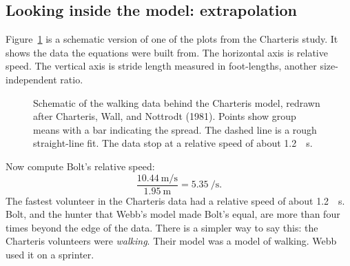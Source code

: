\documentclass[11pt,twoside,openany]{book}
\begin{document}
\subsection{Looking inside the model: extrapolation}

Figure~\ref{fig:charteris} is a schematic version of one of the plots from the Charteris study. It shows the data the equations were built from. The horizontal axis is relative speed. The vertical axis is stride length measured in foot-lengths, another size-independent ratio.

\begin{figure}[htb]
\centering
{}
\caption{Schematic of the walking data behind the Charteris model, redrawn after Charteris, Wall, and Nottrodt (1981). Points show group means with a bar indicating the spread. The dashed line is a rough straight-line fit. The data stop at a relative speed of about \SI{1.2}{\per\second}.}
\label{fig:charteris}
\end{figure}

Now compute Bolt's relative speed:
\[
\frac{\SI{10.44}{\metre\per\second}}{\SI{1.95}{\metre}} = \SI{5.35}{\per\second}.
\]
The fastest volunteer in the Charteris data had a relative speed of about \SI{1.2}{\per\second}. Bolt, and the hunter that Webb's model made Bolt's equal, are more than four times beyond the edge of the data. There is a simpler way to say this: the Charteris volunteers were \emph{walking}. Their model was a model of walking. Webb used it on a sprinter.
\end{document}
